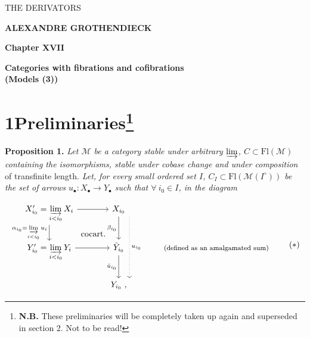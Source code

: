 \documentclass[11pt]{article}
\newcommand{\printedpage}[1]{\marginpar{\footnotesize p.~#1}}
\newcommand{\msp}[1]{\marginpar{\footnotesize [#1]}}
\newcommand{\Fl}{\mathrm{Fl}}
\begin{document}
\printedpage{--}

\begin{center}
\vspace*{5cm}

{\Large\textsf{THE DERIVATORS}}

\bigskip

\textbf{ALEXANDRE GROTHENDIECK}

\vspace{2cm}

\textbf{Chapter XVII}

\medskip

\textbf{Categories with fibrations and cofibrations}\\
\textbf{(Models (3))}
\end{center}

\clearpage


\printedpage{1}

\msp{page 1}

\section*{1\quad Preliminaries\footnote{\textbf{N.B.} These preliminaries will be completely taken up again and superseded in section 2. Not to be read!}}

\textbf{Proposition 1.} \textit{Let $\mathcal{M}$ be a category stable under arbitrary $\varinjlim$, $C \subset \Fl(\mathcal{M})$ containing the isomorphisms, stable under cobase change and under composition} of transfinite length. \textit{Let, for every small ordered set $I$, $C_I \subset \Fl(\mathcal{M}(I^{\circ}))$ be the set of arrows $u_\bullet : X_\bullet \longrightarrow Y_\bullet$ such that $\forall\ i_0 \in I$, in the diagram} %

\[
\begin{tikzcd}[column sep=large]
X'_{i_0} = \varinjlim\limits_{i<i_0} X_i \arrow[r] \arrow[d, "\alpha_{i_0} = \varinjlim\limits_{i<i_0} u_i"'] \arrow[dr, phantom, "\text{cocart.}"] & X_{i_0} \arrow[d, "\beta_{i_0}"'] \arrow[dd, dotted, shift left=3ex, "u_{i_0}"] & \\
Y'_{i_0} = \varinjlim\limits_{i<i_0} Y_i \arrow[r] & \tilde{Y}_{i_0} \arrow[d, "\tilde{u}_{i_0}"'] & \text{\footnotesize (defined as an amalgamated sum)} \\
& Y_{i_0}\ , &
\end{tikzcd}
\tag*{$(*)$}
\]
\end{document}
